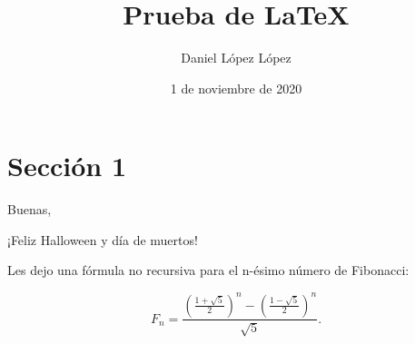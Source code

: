 \documentclass[a4paper,12pt]{article}
\title{Prueba de \LaTeX{}} %
\author{Daniel López López} %
\date{1 de noviembre de 2020}
\begin{document}
\maketitle

% 

\section{Sección 1}

Buenas,  %

¡Feliz Halloween y día de muertos! %


Les dejo una fórmula no recursiva para el n-ésimo número de Fibonacci:

\[ F_n = \frac{\left(\frac{1+\sqrt{5}}{2}\right)^n - \left(\frac{1-\sqrt{5}}{2}\right)^n}{\sqrt{5}}. \]
\end{document}
